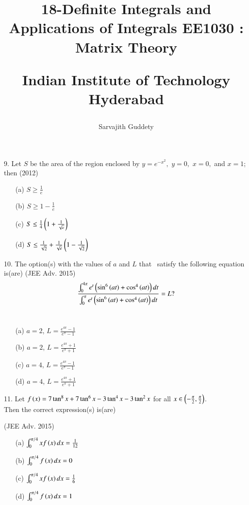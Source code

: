 \documentclass[journal,12pt,twocolumn]{IEEEtran}
\title{18-Definite Integrals and Applications of Integrals
\large{EE1030 : Matrix Theory}

Indian Institute of Technology Hyderabad
}
\author{Sarvajith Guddety}
\theoremstyle{remark}
\begin{document}
\maketitle

9. Let  $ S $ be the area of the region enclosed by $y = e^{-x^2} ,$  $y = 0 ,$ $x = 0 ,$ and $ x = 1 $; then \hfill (2012)

\begin{multicols}{2}
\begin{enumerate}
\item[(a)] $ S \geq \frac{1}{e} $
\item[(b)] $S \geq 1 - \frac{1}{e}$
\columnbreak
\item[(c)] $ S \leq \frac{1}{4} \left(1 + \frac{1}{\sqrt{e}}\right)$
\item[(d)] $S\leq\frac{1}{\sqrt{2}}+\frac{1}{\sqrt{e}}\left(1 -\frac{1}{\sqrt{2}}\right) $
\end{enumerate}
\end{multicols}

10. The option(s) with the values of $a$ and $L$ that \ satisfy the following equation is(are) \hfill (JEE Adv. 2015)
\begin{align*}
    \frac{\int_0^{4\pi} e^t  \left(\sin^6\left(at\right) + \cos^4\left(at\right)\right)  dt}{\int_0^{\pi} e^t  \left(\sin^6\left(at\right) + \cos^4\left(at\right)\right) dt} = L?
\end{align*} \\
\begin{multicols}{2}
\begin{enumerate}
\item  [(a)] $a = 2$, $L = \frac{e^{4\pi} - 1}{e^\pi - 1}$
\item [(b)] $a = 2$, $L = \frac{e^{4\pi} + 1}{e^\pi + 1}$
\columnbreak
\item [(c)] $a = 4$, $L = \frac{e^{4\pi} - 1}{e^\pi - 1}$
\item[(d)] $a = 4$, $L = \frac{e^{4\pi} + 1}{e^\pi + 1}$
\end{enumerate}
\end{multicols}

11. Let $f\left(x\right)= 7\tan^8x + 7\tan^6x - 3\tan^4x - 3\tan^2x$ for all $x \in \left(-\frac{\pi}{2}, \frac{\pi}{2}\right) $. \\
Then the correct expression(s) is(are)

\hfill  (JEE Adv. 2015)
\begin{multicols}{2}
\begin{enumerate}
\item[(a)] $\int_0^{\pi/4} x f\left(x\right)dx = \frac{1}{12}$
\item[(b)]$\int_0^{\pi/4} f\left(x\right)dx = 0$
\columnbreak
\item[(c)] $\int_0^{\pi/4} x f\left(x\right)dx = \frac{1}{6}$
\item [(d)] $\int_0^{\pi/4} f\left(x\right)dx = 1$
\end{enumerate}
\end{multicols}
\end{document}
